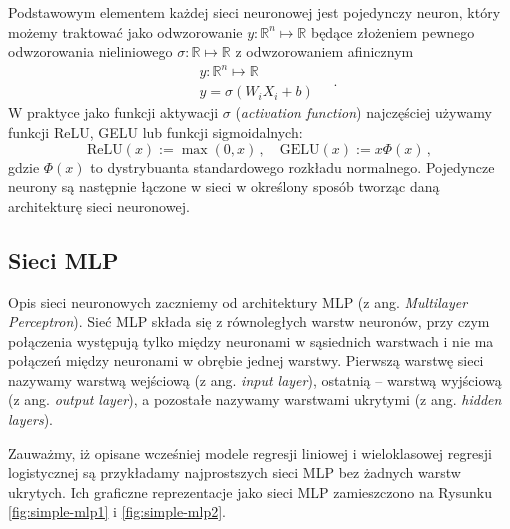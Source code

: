 \documentclass{myclass}
\begin{document}
Podstawowym elementem każdej sieci neuronowej jest pojedynczy neuron, który możemy traktować jako
odwzorowanie \(y: \mathbb{R}^n \mapsto \mathbb{R}\) będące złożeniem pewnego odwzorowania
nieliniowego \(\sigma:\mathbb{R} \mapsto \mathbb{R}\) z odwzorowaniem afinicznym
\begin{equation*}
    \begin{split}
        &y: \mathbb{R}^n \mapsto \mathbb{R}\\
        &y = \sigma\left(W_i X_i + b\right)
    \end{split}\quad.
\end{equation*}
W praktyce jako funkcji aktywacji \(\sigma\) (\textit{activation function}) najczęściej używamy
funkcji ReLU, GELU lub funkcji sigmoidalnych:
\begin{equation*}
    \text{ReLU}(x) := \max(0, x)\,,\quad \text{GELU}(x) := x\Phi(x)\,,
\end{equation*}
gdzie \(\Phi(x)\) to dystrybuanta standardowego rozkładu normalnego. Pojedyncze neurony są następnie
łączone w sieci w określony sposób tworząc daną architekturę sieci neuronowej.

\subsection{Sieci MLP}

Opis sieci neuronowych zaczniemy od architektury MLP (z ang. \textit{Multilayer Perceptron}). Sieć
MLP składa się z równoległych warstw neuronów, przy czym połączenia występują tylko między neuronami
w sąsiednich warstwach i nie ma połączeń między neuronami w obrębie jednej warstwy. Pierwszą warstwę
sieci nazywamy warstwą wejściową (z ang. \textit{input layer}), ostatnią -- warstwą wyjściową (z
ang. \textit{output layer}), a pozostałe nazywamy warstwami ukrytymi (z ang. \textit{hidden
layers}).

Zauważmy, iż opisane wcześniej modele regresji liniowej i wieloklasowej regresji logistycznej są
przykładamy najprostszych sieci MLP bez żadnych warstw ukrytych. Ich graficzne reprezentacje jako
sieci MLP zamieszczono na Rysunku \ref{fig:simple-mlp1} i \ref{fig:simple-mlp2}. 
\end{document}

